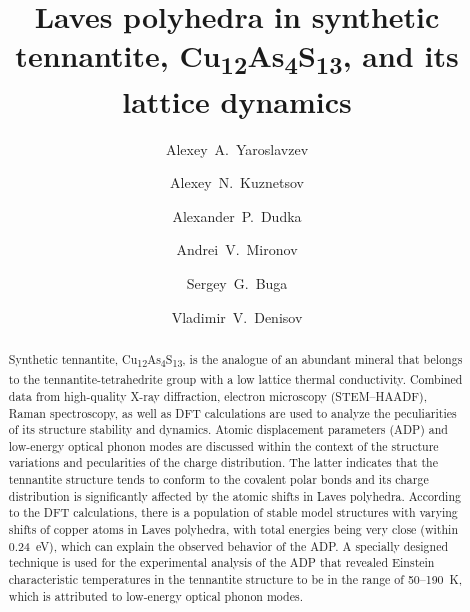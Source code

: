 \documentclass[preprint,review,12pt]{elsarticle}
\begin{document}
\begin{frontmatter}



\title{Laves polyhedra in synthetic tennantite, Cu\textsubscript{12}As\textsubscript{4}S\textsubscript{13}, and its lattice dynamics}

\author[TISNCM]{Alexey~A.~Yaroslavzev}
\author[MSU,ICRAS]{Alexey~N.~Kuznetsov}
\author[SIC]{Alexander~P.~Dudka}
\author[MSU]{Andrei~V.~Mironov}
\author[TISNCM]{Sergey~G.~Buga}
\author[TISNCM]{Vladimir~V.~Denisov}

\address[TISNCM]{Technological Institute for Superhard and Novel Carbon Materials, 108840, Troitsk, Moscow, Russia}
\address[MSU]{Department of Chemistry, Lomonosov Moscow State University, 119991, Moscow, Russia}
\address[ICRAS]{Kurnakov Institute of General and Inorganic Chemistry RAS, 119991, Moscow, Russia}
\address[SIC]{Shubnikov Institute of Crystallography of Federal Scientific Research Centre “Crystallography and Photonics” of Russian Academy of Sciences, Leninskiy Prospekt 59, 119333, Moscow, Russia}


\begin{abstract}
Synthetic tennantite, Cu\textsubscript{12}As\textsubscript{4}S\textsubscript{13}, is the analogue of an abundant mineral that belongs to the tennantite-tetrahedrite group with a low lattice thermal conductivity.
Combined data from high-quality X-ray diffraction, electron microscopy (STEM--HAADF), Raman spectroscopy, as well as DFT calculations are used to analyze the peculiarities of its structure stability and dynamics.
Atomic displacement parameters (ADP) and low-energy optical phonon modes are discussed within the context of the structure variations and pecularities of the charge distribution.
The latter indicates that the tennantite structure tends to conform to the covalent polar bonds and its charge distribution is significantly affected by the atomic shifts in Laves polyhedra.
According to the DFT calculations, there is a population of stable model structures with varying shifts of copper atoms in Laves polyhedra, with total energies being very close (within 0.24~eV), which can explain the observed behavior of the ADP.
A specially designed  technique is used for the experimental analysis of the ADP that revealed Einstein characteristic temperatures in the tennantite structure to be in the range of 50--190~K, which is attributed to  low-energy optical phonon modes.



\end{abstract}
\end{frontmatter}
\end{document}
